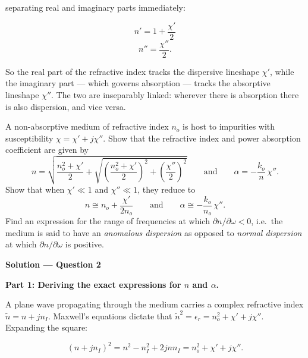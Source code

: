 separating real and imaginary parts immediately:

\begin{equation*}
  \boxed{n' = 1 + \frac{\chi'}{2}}
\end{equation*}
\begin{equation*}
  \boxed{n'' = \frac{\chi''}{2}.}
\end{equation*}

So the real part of the refractive index tracks the dispersive lineshape $\chi'$, while the imaginary part — which governs absorption — tracks the absorptive lineshape $\chi''$. The two are inseparably linked: wherever there is absorption there is also dispersion, and vice versa.


\begin{question}[Question 2]A non-absorptive medium of refractive index $n_{o}$ is host to impurities
with susceptibility $\chi=\chi'+j\chi''$. Show that the refractive index and power absorption
coefficient are given by
\begin{equation*}
  n = \sqrt{\frac{n_{o}^{2}+\chi'}{2}
      + \sqrt{\left(\frac{n_{o}^{2}+\chi'}{2}\right)^{2}+\left(\frac{\chi''}{2}\right)^{2}}}
  \qquad\mathrm{and}\qquad
  \alpha = -\frac{k_{o}}{n}\,\chi''.
\end{equation*}
Show that when $\chi'\ll 1$ and $\chi''\ll 1$, they reduce to
\begin{equation*}
  n\cong n_{o}+\frac{\chi'}{2n_{o}}
  \qquad\mathrm{and}\qquad
  \alpha\cong -\frac{k_{o}}{n_{o}}\,\chi''.
\end{equation*}
Find an expression for the range of frequencies at which $\partial n/\partial\omega<0$, i.e.\ the
medium is said to have an \emph{anomalous dispersion} as opposed to \emph{normal dispersion} at
which $\partial n/\partial\omega$ is positive.
\end{question}

\textbf{\large Solution --- Question 2}

\textbf{Part 1: Deriving the exact expressions for $n$ and $\alpha$.}

A plane wave propagating through the medium carries a complex refractive index $\tilde{n} = n + jn_I$. Maxwell's equations dictate that $\tilde{n}^2 = \epsilon_r = n_o^2 + \chi' + j\chi''$. Expanding the square:

\begin{equation}
  (n + jn_I)^2 = n^2 - n_I^2 + 2jnn_I = n_o^2 + \chi' + j\chi''. \tag{I}
\end{equation}

